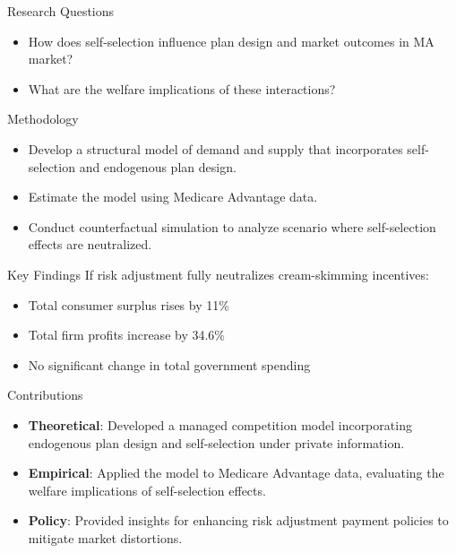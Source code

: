 \documentclass[professionalfonts, aspectratio=169]{beamer}
\begin{document}
\begin{frame}{Research Questions}
  \begin{itemize}
    \item How does self-selection influence plan design and market outcomes in MA market?
    \item What are the welfare implications of these interactions?
  \end{itemize}
\end{frame}

\begin{frame}{Methodology}
  \begin{itemize}
    \item Develop a structural model of demand and supply that incorporates self-selection and endogenous plan design.
    \item Estimate the model using Medicare Advantage data.
    \item Conduct counterfactual simulation to analyze scenario where self-selection effects are neutralized.
  \end{itemize}
\end{frame}

\begin{frame}{Key Findings}
  If risk adjustment fully neutralizes cream-skimming incentives:
  \begin{itemize}
    \item Total consumer surplus rises by 11\%
    \item Total firm profits increase by 34.6\%
    \item No significant change in total government spending
  \end{itemize}
\end{frame}

\begin{frame}{Contributions}
  \begin{itemize}
    \item \textbf{Theoretical}: Developed a managed competition model incorporating endogenous plan design and self-selection under private information.
    \item \textbf{Empirical}: Applied the model to Medicare Advantage data, evaluating the welfare implications of self-selection effects.
    \item \textbf{Policy}: Provided insights for enhancing risk adjustment payment policies to mitigate market distortions.
  \end{itemize}
\end{frame}
\end{document}
